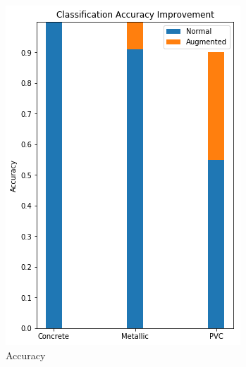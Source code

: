 \begin{figure}[H]
  \centering
  \begin{subfigure}[b]{0.4\linewidth}
    \includegraphics[width=\linewidth]{figures/Combined-Accuracy.png}
    \caption{Accuracy}
  \end{subfigure}
  \begin{subfigure}[b]{0.4\linewidth}

\end{subfigure}
\end{figure}
